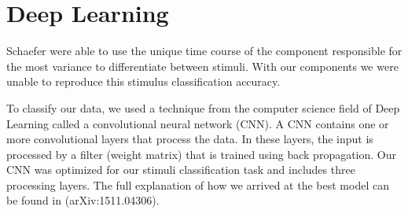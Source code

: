 \chapter{Deep Learning}
Schaefer \etal \citeyear{schaefer_name_2011} were able to use the unique time course of the component responsible for the most variance to differentiate between stimuli.
With our components we were unable to reproduce this stimulus classification accuracy. 
 
To classify our data, we used a technique from the computer science field of Deep Learning called a convolutional neural network (\ac{CNN}).
A \ac{CNN} contains one or more convolutional layers that process the data.
In these layers, the input is processed by a filter (weight matrix) that is trained using back propagation. 
Our \ac{CNN} was optimized for our stimuli classification task and includes three processing layers.
The full explanation of how we arrived at the best model can be found in \cite{stober_ICLR2016} (arXiv:1511.04306).

